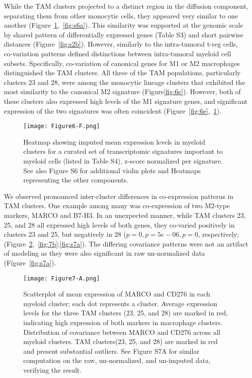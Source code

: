 While the TAM clusters projected to a distinct region in the diffusion component, separating them from other monocytic cells, they appeared very similar to one another (Figure~\ref{fig:6f},~\ref{fig:s6a}).
This similarity was supported at the genomic scale by shared pattern of differentially expressed genes (Table S3) and short pairwise distances (Figure~\ref{fig:s2b}). %
However, similarly to the intra-tumoral t-reg cells, co-variation patterns defined distinctions between intra-tumoral myeloid cell subsets.
Specifically, co-variation of canonical genes for M1 or M2 macrophages distinguished the TAM clusters.
All three of the TAM populations, particularly clusters 23 and 28, were among the monocytic lineage clusters that exhibited the most similarity to the canonical M2 signature (Figure\ref{fig:6e}).
However, both of these clusters also expressed high levels of the M1 signature genes, and significant expression of the two signatures was often coincident (Figure~\ref{fig:6e},~\ref{fig:6f}).

\begin{figure}
\centering
\texttt{[image: Figure6-F.png]}
\caption{Heatmap showing imputed mean expression levels in myeloid clusters for a curated set of transcriptomic signatures important to myeloid cells (listed in Table S4), z-score normalized per signature.
See also Figure S6 for additional violin plots and Heatmaps representing the other components. %
}
\label{fig:6f}
\end{figure}

We observed pronounced inter-cluster differences in co-expression patterns in TAM clusters.
One example among many was co-expression of two M2-type markers, MARCO and B7-H3.
In an unexpected manner, while TAM clusters 23, 25, and 28 all expressed high levels of both genes, they co-varied positively in clusters 23 and 25, but negatively in 28 ($p=0, p=5e-06, p=0$, respectively; (Figure~\ref{fig:7a},~\ref{fig:7b};\ref{fig:s7a}).
The differing covariance patterns were not an artifact of modeling as they were also significant in raw un-normalized data (Figure~\ref{fig:s7a}).

\begin{figure}
\centering
\texttt{[image: Figure7-A.png]}
\caption{Scatterplot of mean expression of MARCO and CD276 in each myeloid cluster; each dot represents a cluster.
  Average expression levels for the three TAM clusters (23, 25, and 28) are marked in red, indicating high expression of both markers in macrophage clusters.
Distribution of covariance between MARCO and CD276 across all myeloid clusters.
TAM clusters(23, 25, and 28) are marked in red and present substantial outliers.
See Figure S7A for similar computation on the raw, un-normalized, and un-imputed data, verifying the result.
}
\label{fig:7a}
\end{figure}

